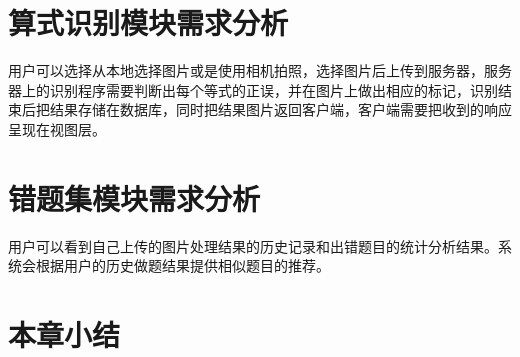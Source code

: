 \section{算式识别模块需求分析}
用户可以选择从本地选择图片或是使用相机拍照，选择图片后上传到服务器，服务器上的识别程序需要判断出每个等式的正误，并在图片上做出相应的标记，识别结束后把结果存储在数据库，同时把结果图片返回客户端，客户端需要把收到的响应呈现在视图层。

\section{错题集模块需求分析}
用户可以看到自己上传的图片处理结果的历史记录和出错题目的统计分析结果。系统会根据用户的历史做题结果提供相似题目的推荐。

\section{本章小结}

